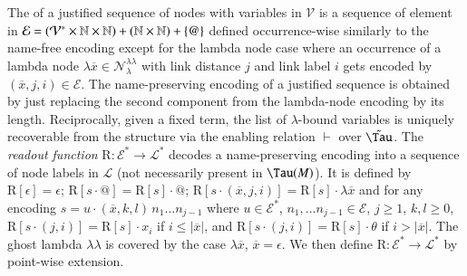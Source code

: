 \documentclass{elsarticle}
\theoremstyle{plain}
\theoremstyle{definition}
\newcommand\VarSet{\mathcal{V}}
\newcommand\Nodes{\mathcal{N}}%
\newcommand\NodesLmd{\Nodes_\lambda}%
\newcommand{\ghostlmd}{{\lambda\!\!\lambda}}
\newcommand{\ghostvar}{\theta}
\newcommand\ExtendedNodesLmd{\NodesLmd^\ghostlmd}
\def\readout{\mathrm{R}} %
\def\nameencoding{\mathcal{E}} %
\newcommand{\enables}{\vdash} %
\newcommand{\ctree}{\Tau} %
\newcommand{\exttree}{\tilde{\Tau}} %
\begin{document}
The  of a justified sequence of nodes with variables in $\VarSet$ is a sequence of element in
$\nameencoding = (\mathcal{V}^*\times\nat\times\nat) +
   (\nat\times\nat)
   + \{ @ \}$  defined occurrence-wise similarly to the name-free encoding
 except for the lambda node case where
  an occurrence of a lambda node $\lambda\overline{x}\in\ExtendedNodesLmd$
 with link distance $j$ and link label $i$ gets encoded
 by $(\overline{x},j,i) \in \mathcal{E}$.
%
The name-preserving encoding of a justified sequence is obtained by just replacing the second component from the lambda-node encoding by its length.
Reciprocally, given a fixed term, the list of $\lambda$-bound variables is uniquely recoverable from the structure via the enabling relation $\enables$ over $\exttree$.
%
%
The \emph{readout function} $\readout: \nameencoding^* \rightarrow \mathcal{L}^*$
decodes a name-preserving encoding into a sequence of node labels in $\mathcal{L}$ (not necessarily present in $\ctree(M)$). It is defined by
$\readout[\epsilon]= \epsilon$;
$\readout[s \cdot @] = \readout[s] \cdot @$;
$\readout[s \cdot (\overline{x}, j, i) ] = \readout[s] \cdot \lambda\overline{x}$
and for any encoding $s = u \cdot (\overline{x}, k, l)\,  n_1 \ldots n_{j-1}$ where $u \in \nameencoding^*$, $n_1, \ldots n_{j-1}\in \nameencoding$, $j\geq 1$, $k,l\geq 0$,
$\readout[s\cdot (j,i)] = \readout[s] \cdot x_i$
if $i\leq |\overline{x}|$, and
$\readout[s\cdot (j,i)]  = \readout[s] \cdot \ghostvar$ if $i> |\overline{x}|$.
The ghost lambda $\ghostlmd$ is covered by the case  $\lambda\overline{x}$, $\overline{x}=\epsilon$.
We then define $\readout \colon \nameencoding^* \rightarrow \mathcal{L}^*$
by point-wise extension.
\end{document}
